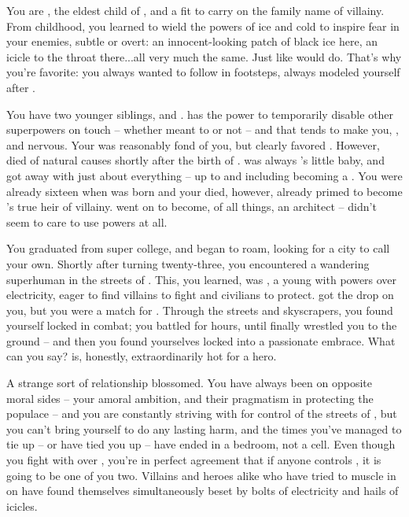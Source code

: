 \documentclass[char]{LRSguildcamp1}
\begin{document}
\name{\cOldest{}}

You are \cOldest{\intro}, the eldest child of \cGrandma{\intro}, and a \cOldest{\offspring} fit to carry on the family name of villainy.  
From childhood, you learned to wield the powers of ice and cold to inspire fear in your enemies, subtle or overt: an innocent-looking patch of black ice here, an icicle to the throat there...all very much the same.  Just like \cGrandma{\Parent} would do.  That's why you're \cGrandma{\their} favorite: you always wanted to follow in \cGrandma{\their} footsteps, always modeled yourself after \cGrandma{\them}. %

You have two younger siblings, \cArchitect{\intro} and \cYoungest{\intro}.  \cArchitect{} has the power to temporarily disable other superpowers on touch -- whether \cArchitect{\they} meant to or not -- and that tends to make you, \cYoungest{}, and \cGrandma{\Parent} nervous.  Your \cGS{\parent} \cGS{\intro} was reasonably fond of you, but clearly favored \cArchitect{}.  However, \cGS{} died of natural causes shortly after the birth of \cYoungest{}. \cYoungest{} was always \cGrandma{\Parent}'s little baby, and got away with just about everything -- up to and including becoming a \cYoungest{\hero}.  You were already sixteen when \cYoungest{} was born and your \cGS{\parent} died, however, already primed to become \cGrandma{\Parent}'s true heir of villainy.  \cArchitect{} went on to become, of all things, an architect -- \cArchitect{\they} didn't seem to care to use \cArchitect{\their} powers at all.

You graduated from super college, and began to roam, looking for a city to call your own.  Shortly after turning twenty-three, you encountered a wandering superhuman in the streets of \pCityO{}.  This, you learned, was \cOS{\intro}, a young \cOS{\hero} with powers over electricity, eager to find villains to fight and civilians to protect.  \cOS{\They} got the drop on you, but you were a match for \cOS{\them}.   Through the streets and skyscrapers, you found yourself locked in combat; you battled for hours, until \cOS{\they} finally wrestled you to the ground -- and then you found yourselves locked into a passionate embrace.  What can you say?  \cOS{} is, honestly, extraordinarily hot for a hero.

A strange sort of relationship blossomed.  You have always been on opposite moral sides -- your amoral ambition, and their pragmatism in protecting the populace -- and you are constantly striving with \cOS{\them} for control of the streets of \pCityO{}, but you can't bring yourself to do \cOS{\them} any lasting harm, and the times you've managed to tie \cOS{\them} up -- or \cOS{\they} have tied you up -- have ended in a bedroom, not a cell.
Even though you fight with \cOS{} over \pCityO{}, you're in perfect agreement that if anyone controls \pCityO{}, it is going to be one of you two.  Villains and heroes alike who have tried to muscle in on \pCityO{} have found themselves simultaneously beset by bolts of electricity and hails of icicles.
\end{document}
